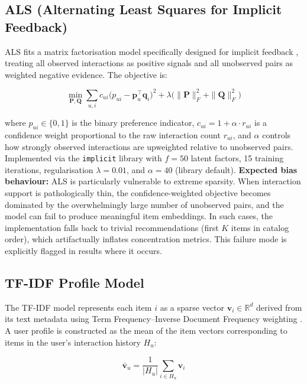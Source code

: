 \documentclass[11pt,a4paper]{report}
\begin{document}
\subsection*{ALS (Alternating Least Squares for Implicit Feedback)}

ALS fits a matrix factorisation model specifically designed for implicit feedback \citep{hu2008collaborative}, treating all observed interactions as positive signals and all unobserved pairs as weighted negative evidence. The objective is:

\begin{equation}
\min_{\mathbf{P},\mathbf{Q}} \sum_{u,i} c_{ui}\bigl(p_{ui} - \mathbf{p}_u^\top \mathbf{q}_i\bigr)^2 + \lambda\bigl(\|\mathbf{P}\|_F^2 + \|\mathbf{Q}\|_F^2\bigr)
\end{equation}

where $p_{ui} \in \{0,1\}$ is the binary preference indicator, $c_{ui} = 1 + \alpha \cdot r_{ui}$ is a confidence weight proportional to the raw interaction count $r_{ui}$, and $\alpha$ controls how strongly observed interactions are upweighted relative to unobserved pairs. Implemented via the \texttt{implicit} library \citep{benfred2018implicit} with $f = 50$ latent factors, 15 training iterations, regularisation $\lambda = 0.01$, and $\alpha = 40$ (library default). \textbf{Expected bias behaviour:} ALS is particularly vulnerable to extreme sparsity. When interaction support is pathologically thin, the confidence-weighted objective becomes dominated by the overwhelmingly large number of unobserved pairs, and the model can fail to produce meaningful item embeddings. In such cases, the implementation falls back to trivial recommendations (first $K$ items in catalog order), which artifactually inflates concentration metrics. This failure mode is explicitly flagged in results where it occurs.

\subsection*{TF-IDF Profile Model}

The TF-IDF model represents each item $i$ as a sparse vector $\mathbf{v}_i \in \mathbb{R}^d$ derived from its text metadata using Term Frequency--Inverse Document Frequency weighting \citep{manning2008introduction}. A user profile is constructed as the mean of the item vectors corresponding to items in the user's interaction history $H_u$:

\begin{equation}
\bar{\mathbf{v}}_u = \frac{1}{|H_u|} \sum_{i \in H_u} \mathbf{v}_i
\end{equation}
\end{document}
